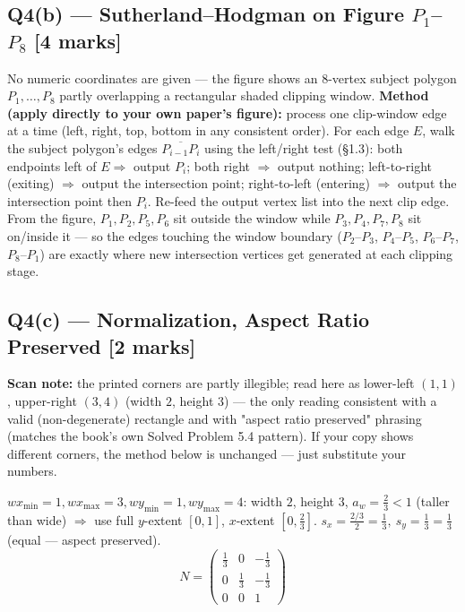 \documentclass[12pt, a4paper]{article}
\newenvironment{solutionbox}{\begin{mdframed}[style=solutionframe]}{\end{mdframed}}
\newenvironment{answerbox}{\begin{mdframed}[style=answerframe]}{\end{mdframed}}
\newenvironment{notesbox}{\begin{mdframed}[style=notesframe]}{\end{mdframed}}
\begin{document}
\subsection*{Q4(b) --- Sutherland--Hodgman on Figure $P_1$--$P_8$ [4 marks]}
\begin{answerbox}
No numeric coordinates are given --- the figure shows an 8-vertex subject polygon $P_1,\dots,P_8$ partly overlapping a rectangular shaded clipping window. \textbf{Method (apply directly to your own paper's figure):} process one clip-window edge at a time (left, right, top, bottom in any consistent order). For each edge $E$, walk the subject polygon's edges $\overline{P_{i-1}P_i}$ using the left/right test (\S1.3): both endpoints left of $E\Rightarrow$ output $P_i$; both right $\Rightarrow$ output nothing; left-to-right (exiting) $\Rightarrow$ output the intersection point; right-to-left (entering) $\Rightarrow$ output the intersection point then $P_i$. Re-feed the output vertex list into the next clip edge. From the figure, $P_1,P_2,P_5,P_6$ sit outside the window while $P_3,P_4,P_7,P_8$ sit on/inside it --- so the edges touching the window boundary ($P_2$--$P_3$, $P_4$--$P_5$, $P_6$--$P_7$, $P_8$--$P_1$) are exactly where new intersection vertices get generated at each clipping stage.
\end{answerbox}

\subsection*{Q4(c) --- Normalization, Aspect Ratio Preserved [2 marks]}
\begin{notesbox}
\textbf{Scan note:} the printed corners are partly illegible; read here as lower-left $(1,1)$, upper-right $(3,4)$ (width $2$, height $3$) --- the only reading consistent with a valid (non-degenerate) rectangle and with "aspect ratio preserved" phrasing (matches the book's own Solved Problem 5.4 pattern). If your copy shows different corners, the method below is unchanged --- just substitute your numbers.
\end{notesbox}
\begin{solutionbox}
$wx_{\min}=1,wx_{\max}=3,wy_{\min}=1,wy_{\max}=4$: width $2$, height $3$, $a_w=\frac23<1$ (taller than wide) $\Rightarrow$ use full $y$-extent $[0,1]$, $x$-extent $\left[0,\frac23\right]$. $s_x=\frac{2/3}{2}=\frac13,\ s_y=\frac{1}{3}=\frac13$ (equal --- aspect preserved).
$$N=\begin{pmatrix}\tfrac13&0&-\tfrac13\\0&\tfrac13&-\tfrac13\\0&0&1\end{pmatrix}$$
\end{solutionbox}
\end{document}
